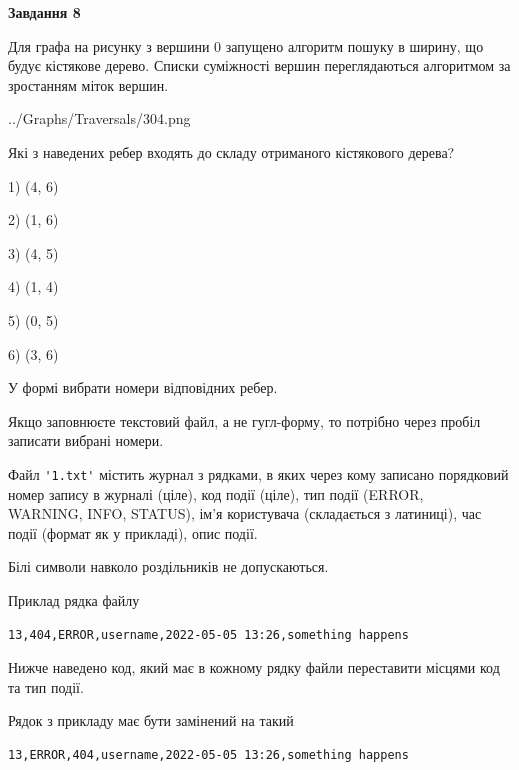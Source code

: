 \documentclass[12pt, ukrainian]{article}
\def\code#1{\Verb!#1!}
\begin{document}
{\begin {large}
{\begin {center}\textbf{Завдання 8}\end {center}}\par
Для графа на рисунку з вершини 0 запущено алгоритм пошуку в ширину, що будує кістякове дерево. Списки суміжності вершин переглядаються алгоритмом за зростанням міток вершин.\par
\begin{center}
	{../Graphs/Traversals/304.png}
\end{center}
\par Які з наведених ребер входять до складу отриманого кістякового дерева?\par
1) (4, 6)\par
2) (1, 6)\par
3) (4, 5)\par
4) (1, 4)\par
5) (0, 5)\par
6) (3, 6)\par
{\vskip 15pt} У формі вибрати номери відповідних ребер.


Якщо заповнюєте текстовий файл, а не гугл-форму, то потрібно через пробіл записа\-ти вибрані номери.\par
\newpage


Файл \code{'1.txt'} містить журнал з рядками, в яких через кому записано поряд\-ко\-вий номер запису в журналі (ціле), код події (ціле), тип події (ERROR,\\ WARNING, INFO, STATUS), ім'я користувача (складається з латиниці), час події (фор\-мат як у прикладі), опис події.

Білі символи навколо роздільників не допускаються.

Приклад рядка файлу



\begin{verbatim}
13,404,ERROR,username,2022-05-05 13:26,something happens
\end{verbatim}


Нижче наведено код, який має в кожному рядку файли переставити місцями код та тип події.

Рядок з прикладу має бути замінений на такий



\begin{verbatim}
13,ERROR,404,username,2022-05-05 13:26,something happens
\end{verbatim}





\end{large}}
\end{document}
